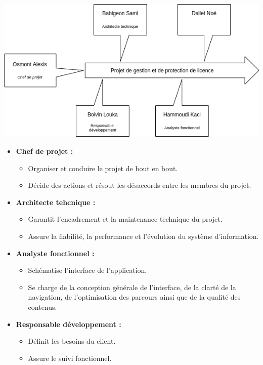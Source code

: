 \includegraphics[width=15cm]{schema_role_projet.png}
\\ \newline
\begin{itemize}
	\item  \textbf{Chef de projet :} \newline
	\begin{itemize}
		\item Organiser et conduire le projet de bout en bout.
		\item Décide des actions et résout les désaccords entre les membres du projet.\newline
	\end{itemize}
	\item \textbf{Architecte tehcnique :} \newline
	\begin{itemize}
		\item Garantit l'encadrement et la maintenance technique du projet.
		\item Assure la fiabilité, la performance et l'évolution du système d'information.\newline
	\end{itemize}
	\newpage
	\item \textbf{Analyste fonctionnel :} \newline
	\begin{itemize}
		\item Schématise l’interface de l’application.
		\item Se charge de la conception générale de l’interface, de la clarté de la
		navigation, de l’optimisation des parcours ainsi que de la qualité des
		contenus.\newline
	\end{itemize}
	
	\item \textbf{Responsable développement :} \newline
	\begin{itemize}
		\item Définit les besoins du client.
		\item Assure le suivi fonctionnel.\newline
	\end{itemize}
	
	
\end{itemize}

